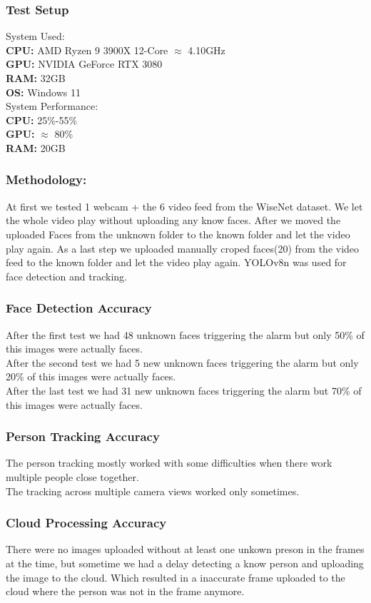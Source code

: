 \documentclass[conference]{IEEEtran}
\begin{document}
\subsubsection{Test Setup}

System Used:\\
\textbf{CPU:} AMD Ryzen 9 3900X 12-Core $\approx$ 4.10GHz\\
\textbf{GPU:} NVIDIA GeForce RTX 3080\\
\textbf{RAM:} 32GB\\
\textbf{OS:} Windows 11\\
System Performance:\\
\textbf{CPU:} 25\%-55\%\\
\textbf{GPU:} $\approx$ 80\%\\
\textbf{RAM:} 20GB
\subsubsection{Methodology:}
At first we tested 1 webcam + the 6 video feed from the WiseNet dataset. We let the whole video play without uploading any know faces.
After we moved the uploaded Faces from the unknown folder to the known folder and let the video play again.
As a last step we uploaded manually croped faces(20) from the video feed to the known folder and let the video play again.
YOLOv8n was used for face detection and tracking.
\subsubsection{Face Detection Accuracy}
After the first test we had 48 unknown faces triggering the alarm but only 50\% of this images were actually faces.\\
After the second test we had 5 new unknown faces triggering the alarm but only 20\% of this images were actually faces.\\
After the last test we had 31 new unknown faces triggering the alarm but 70\% of this images were actually faces.\\

\subsubsection{Person Tracking Accuracy}
The person tracking mostly worked with some difficulties when there work multiple people close together.\\
The tracking across multiple camera views worked only sometimes.

\subsubsection{Cloud Processing Accuracy}
There were no images uploaded without at least one unkown preson in the frames at the time, but
sometime we had a delay detecting a know person and uploading the image to the cloud.
Which resulted in a inaccurate frame uploaded to the cloud where the person was not in the frame anymore.
\end{document}
